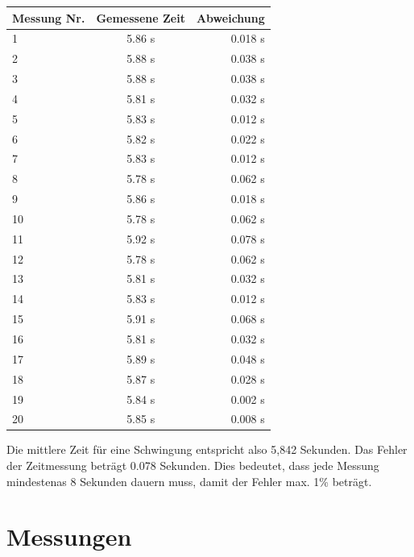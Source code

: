 \documentclass[12pt, a4paper, twoside]{article}
\begin{document}
      \begin{center}
    \begin{tabular}{l|c|r} %
      \textbf{Messung Nr.} & \textbf{Gemessene Zeit} & \textbf{Abweichung}\\
    
      \hline 
      1 & 5.86 s & 0.018 s \\
      2 & 5.88 s & 0.038 s \\
      3 & 5.88 s & 0.038 s \\
      4 & 5.81 s & 0.032 s \\
      5 & 5.83 s& 0.012 s \\
      6 & 5.82 s & 0.022 s \\
      7 & 5.83 s & 0.012 s \\
      8 & 5.78 s & 0.062 s \\
      9 & 5.86 s & 0.018 s \\
      10 & 5.78 s & 0.062 s \\
      11 & 5.92 s & 0.078 s \\
      12 & 5.78 s & 0.062 s \\
      13 & 5.81 s & 0.032 s \\
      14 & 5.83 s & 0.012 s \\
      15 & 5.91 s & 0.068 s \\
      16 & 5.81 s & 0.032 s \\
      17 & 5.89 s & 0.048 s \\
      18 & 5.87 s & 0.028 s \\
      19 & 5.84 s & 0.002 s \\
      20 & 5.85 s & 0.008 s \\

    \end{tabular}
  \end{center}
    Die mittlere Zeit für eine Schwingung entspricht also 5,842 Sekunden.
    Das Fehler der Zeitmessung beträgt 0.078 Sekunden. Dies bedeutet, dass jede Messung mindestenas 8 Sekunden dauern muss, damit der Fehler max. 1\% beträgt.
    \newpage
    \section{Messungen}
\end{document}
